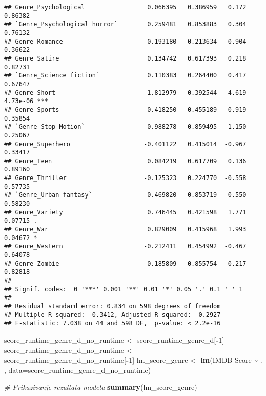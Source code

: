 \documentclass[
]{article}
\newenvironment{Shaded}{\begin{snugshade}}{\end{snugshade}}
\newcommand{\AttributeTok}[1]{\textcolor[rgb]{0.13,0.29,0.53}{#1}}
\newcommand{\CommentTok}[1]{\textcolor[rgb]{0.56,0.35,0.01}{\textit{#1}}}
\newcommand{\DecValTok}[1]{\textcolor[rgb]{0.00,0.00,0.81}{#1}}
\newcommand{\FunctionTok}[1]{\textcolor[rgb]{0.13,0.29,0.53}{\textbf{#1}}}
\newcommand{\NormalTok}[1]{#1}
\newcommand{\OtherTok}[1]{\textcolor[rgb]{0.56,0.35,0.01}{#1}}
\newcommand{\SpecialCharTok}[1]{\textcolor[rgb]{0.81,0.36,0.00}{\textbf{#1}}}
\newcommand{\StringTok}[1]{\textcolor[rgb]{0.31,0.60,0.02}{#1}}
\begin{document}
\begin{verbatim}
## Genre_Psychological                 0.066395   0.386959   0.172  0.86382    
## `Genre_Psychological horror`        0.259481   0.853883   0.304  0.76132    
## Genre_Romance                       0.193180   0.213634   0.904  0.36622    
## Genre_Satire                        0.134742   0.617393   0.218  0.82731    
## `Genre_Science fiction`             0.110383   0.264400   0.417  0.67647    
## Genre_Short                         1.812979   0.392544   4.619 4.73e-06 ***
## Genre_Sports                        0.418250   0.455189   0.919  0.35854    
## `Genre_Stop Motion`                 0.988278   0.859495   1.150  0.25067    
## Genre_Superhero                    -0.401122   0.415014  -0.967  0.33417    
## Genre_Teen                          0.084219   0.617709   0.136  0.89160    
## Genre_Thriller                     -0.125323   0.224770  -0.558  0.57735    
## `Genre_Urban fantasy`               0.469820   0.853719   0.550  0.58230    
## Genre_Variety                       0.746445   0.421598   1.771  0.07715 .  
## Genre_War                           0.829009   0.415968   1.993  0.04672 *  
## Genre_Western                      -0.212411   0.454992  -0.467  0.64078    
## Genre_Zombie                       -0.185809   0.855754  -0.217  0.82818    
## ---
## Signif. codes:  0 '***' 0.001 '**' 0.01 '*' 0.05 '.' 0.1 ' ' 1
## 
## Residual standard error: 0.834 on 598 degrees of freedom
## Multiple R-squared:  0.3412, Adjusted R-squared:  0.2927 
## F-statistic: 7.038 on 44 and 598 DF,  p-value: < 2.2e-16
\end{verbatim}

\begin{Shaded}
\begin{Highlighting}[]
\NormalTok{score\_runtime\_genre\_d\_no\_runtime }\OtherTok{\textless{}{-}}\NormalTok{ score\_runtime\_genre\_d[}\SpecialCharTok{{-}}\DecValTok{1}\NormalTok{]}
\NormalTok{score\_runtime\_genre\_d\_no\_runtime }\OtherTok{\textless{}{-}}\NormalTok{ score\_runtime\_genre\_d\_no\_runtime[}\SpecialCharTok{{-}}\DecValTok{1}\NormalTok{]}
\NormalTok{lm\_score\_genre }\OtherTok{\textless{}{-}} \FunctionTok{lm}\NormalTok{(}\StringTok{\textasciigrave{}}\AttributeTok{IMDB Score}\StringTok{\textasciigrave{}} \SpecialCharTok{\textasciitilde{}}\NormalTok{ . , }\AttributeTok{data=}\NormalTok{score\_runtime\_genre\_d\_no\_runtime)}

\CommentTok{\# Prikazivanje rezultata modela}
\FunctionTok{summary}\NormalTok{(lm\_score\_genre)}
\end{Highlighting}
\end{Shaded}
\end{document}
